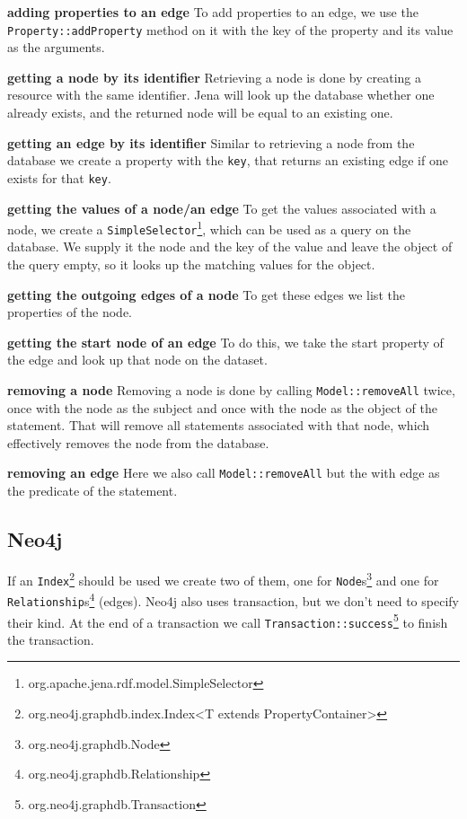 \textbf{adding properties to an edge} \newline
To add properties to an edge,
we use the \texttt{Property::addProperty} method on it with the key of the property and its value as the arguments.

\textbf{getting a node by its identifier} \newline
Retrieving a node is done by creating a resource with the same identifier.
Jena will look up the database whether one already exists,
and the returned node will be equal to an existing one.

\textbf{getting an edge by its identifier} \newline
Similar to retrieving a node from the database we create a property with the \texttt{key},
that returns an existing edge if one exists for that \texttt{key}.

\textbf{getting the values of a node/an edge} \newline
To get the values associated with a node,
we create a \texttt{SimpleSelector}\footnote{org.apache.jena.rdf.model.SimpleSelector},
which can be used as a query on the database.
We supply it the node and the key of the value and leave the object of the query empty,
so it looks up the matching values for the object.

\textbf{getting the outgoing edges of a node} \newline
To get these edges we list the properties of the node.

\textbf{getting the start node of an edge} \newline
To do this,
we take the start property of the edge and look up that node on the dataset.

\textbf{removing a node} \newline
Removing a node is done by calling \texttt{Model::removeAll} twice,
once with the node as the subject and once with the node as the object of the statement.
That will remove all statements associated with that node,
which effectively removes the node from the database.

\textbf{removing an edge} \newline
Here we also call \texttt{Model::removeAll} but the with edge as the predicate of the statement.

\subsection{Neo4j}
If an \texttt{Index}\footnote{org.neo4j.graphdb.index.Index<T extends PropertyContainer>} should be used we create two of them,
one for \texttt{Node}s\footnote{org.neo4j.graphdb.Node} and one for \texttt{Relationship}s\footnote{org.neo4j.graphdb.Relationship} (edges).
Neo4j also uses transaction,
but we don't need to specify their kind.
At the end of a transaction we call \texttt{Transaction::success}\footnote{org.neo4j.graphdb.Transaction} to finish the transaction.


